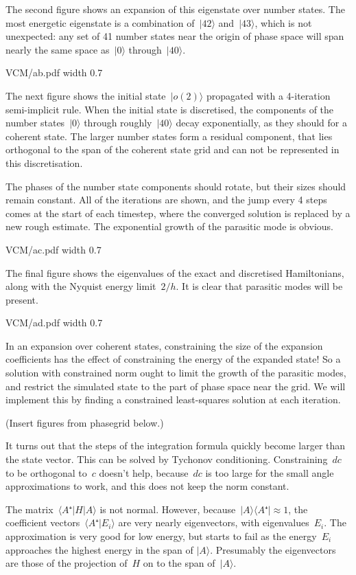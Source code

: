 The second figure shows an expansion of this eigenstate over number states.  The most energetic eigenstate is a combination of~$|42〉$ and~$|43〉$, which is not unexpected: any set of 41 number states near the origin of phase space will span nearly the same space as~$|0〉$ through~$|40〉$.

\XeTeXpdffile VCM/ab.pdf width 0.7\hsize

The next figure shows the initial state~$|o(2)〉$ propagated with a 4-iteration semi-implicit rule.  When the initial state is discretised, the components of the number states~$|0〉$ through roughly~$|40〉$ decay exponentially, as they should for a coherent state.  The larger number states form a residual component, that lies orthogonal to the span of the coherent state grid and can not be represented in this discretisation.

The phases of the number state components should rotate, but their sizes should remain constant.  All of the iterations are shown, and the jump every 4 steps comes at the start of each timestep, where the converged solution is replaced by a new rough estimate.  The exponential growth of the parasitic mode is obvious.

\XeTeXpdffile VCM/ac.pdf width 0.7\hsize

The final figure shows the eigenvalues of the exact and discretised Hamiltonians, along with the Nyquist energy limit~$2/h$.  It is clear that parasitic modes will be present.

\XeTeXpdffile VCM/ad.pdf width 0.7\hsize

In an expansion over coherent states, constraining the size of the expansion coefficients has the effect of constraining the energy of the expanded state!  So a solution with constrained norm ought to limit the growth of the parasitic modes, and restrict the simulated state to the part of phase space near the grid.  We will implement this by finding a constrained least-squares solution at each iteration. 

(Insert figures from phasegrid below.)

It turns out that the steps of the integration formula quickly become larger than the state vector.  This can be solved by Tychonov conditioning.  Constraining~$dc$ to be orthogonal to~$c$ doesn't help, because~$dc$ is too large for the small angle approximations to work, and this does not keep the norm constant.

The matrix~$〈A⁺|H|A〉$ is not normal.  However, because~$|A〉〈A⁺|≈1$, the coefficient vectors~$〈A⁺|E_i〉$ are very nearly eigenvectors, with eigenvalues~$E_i$.  The approximation is very good for low energy, but starts to fail as the energy~$E_i$ approaches the highest energy in the span of $|A〉$.  Presumably the eigenvectors are those of the projection of~$H$ on to the span of~$|A〉$.

